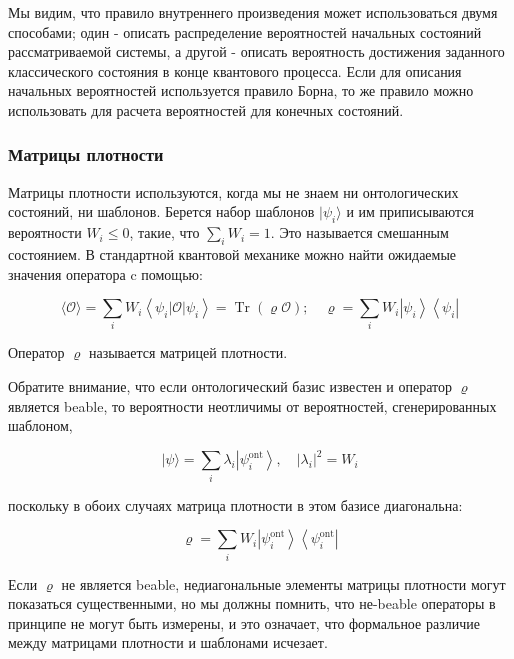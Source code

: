 \documentclass[main.tex]{subfiles}
\begin{document}
Мы видим, что правило внутреннего произведения может использоваться двумя способами; один - описать распределение вероятностей начальных состояний рассматриваемой системы, а другой - описать вероятность достижения заданного классического состояния в конце квантового процесса. Если для описания начальных вероятностей используется правило Борна, то же правило можно использовать для расчета вероятностей для конечных состояний.

\subsubsection{Матрицы плотности}\label{ch5.5.4}

Матрицы плотности используются, когда мы не знаем ни онтологических состояний, ни шаблонов. Берется набор шаблонов $\mid \psi_i \rangle$ и им приписываются  вероятности $W_i \le 0$, такие, что $\sum_i W_i = 1$. Это называется смешанным состоянием. В стандартной квантовой механике можно найти ожидаемые значения оператора c помощью:

\begin{equation}\label{5.16}
	\langle\mathcal{O}\rangle=\sum_{i} W_{i}\left\langle\psi_{i}|\mathcal{O}| \psi_{i}\right\rangle=\operatorname{Tr}(\varrho \mathcal{O}) ; \quad \varrho=\sum_{i} W_{i}\left|\psi_{i}\right\rangle\left\langle\psi_{i}\right|
\end{equation}

Оператор $\varrho$ называется матрицей плотности.

Обратите внимание, что если онтологический базис известен и оператор $\varrho$ является beable, то вероятности неотличимы от вероятностей, сгенерированных шаблоном,


\begin{equation}\label{5.17}
	|\psi\rangle=\sum_{i} \lambda_{i}\left|\psi_{i}^{\mathrm{ont}}\right\rangle, \quad\left|\lambda_{i}\right|^{2}=W_{i}
\end{equation}

поскольку в обоих случаях матрица плотности в этом базисе диагональна:

\begin{equation}\label{5.18}
	\varrho=\sum_{i} W_{i}\left|\psi_{i}^{\mathrm{ont}}\right\rangle\left\langle\psi_{i}^{\mathrm{ont}}\right|
\end{equation}

Если $\varrho$ не является beable, недиагональные элементы матрицы плотности могут показаться существенными, но мы должны помнить, что не-beable операторы в принципе не могут быть измерены, и это означает, что формальное различие между матрицами плотности и шаблонами исчезает.
\end{document}
